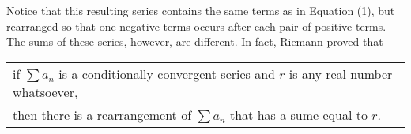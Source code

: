 \documentclass[paper=a4, fontsize=11pt]{scrartcl} %
\numberwithin{equation}{section} %
\numberwithin{figure}{section} %
\numberwithin{table}{section} %
\newcommand{\ds}{\displaystyle}
\newcommand{\sk}{\noalign{\smallskip}}
\newcommand{\senter}{\vspace{3mm}}
\begin{document}
\noindent Notice that this resulting series contains the same terms as in Equation (1), but rearranged so that one negative terms occurs after each pair of positive terms. The sums of these series, however, are different. In fact, Riemann proved that

\senter

\begin{center}
\begin{tabular}{ l }
if $\ds\sum a_n$ is a conditionally convergent series and $r$ is any real number whatsoever, \\
\sk
then there is a rearrangement of $\ds\sum a_n$ that has a sume equal to $r$.
\end{tabular}
\end{center}

\end{document}
